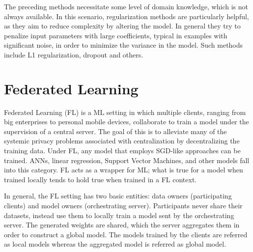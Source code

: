 The preceding methods necessitate some level of domain knowledge, which is not always available. In this scenario, regularization methods are particularly helpful, as they aim to reduce complexity by altering the model. In general they try to penalize input parameters with large coefficients, typical in examples with significant noise, in order to minimize the variance in the model. Such methods include L1 regularization, dropout and others.

\section{Federated Learning}
Federated Learning \cite{FL-original-paper, FL_comprehensive_survey} (FL) is a ML setting in which multiple clients, ranging from big enterprises to personal mobile devices, collaborate to train a model under the supervision of a central server. The goal of this is to alleviate many of the systemic privacy problems associated with centralization by decentralizing the training data. Under FL, any model that employs SGD-like approaches can be trained. ANNs, linear regression, Support Vector Machines, and other models fall into this category. FL acts as a wrapper for ML; what is true for a model when trained locally tends to hold true when trained in a FL context.

In general, the FL setting has two basic entities: data owners (participating clients) and model owners (orchestrating server). Participants never share their datasets, instead use them to locally train a model sent by the orchestrating server. The generated weights are shared, which the server aggregates them in order to construct a global model. The models trained by the clients are referred as local models whereas the aggregated model is referred as global model.

